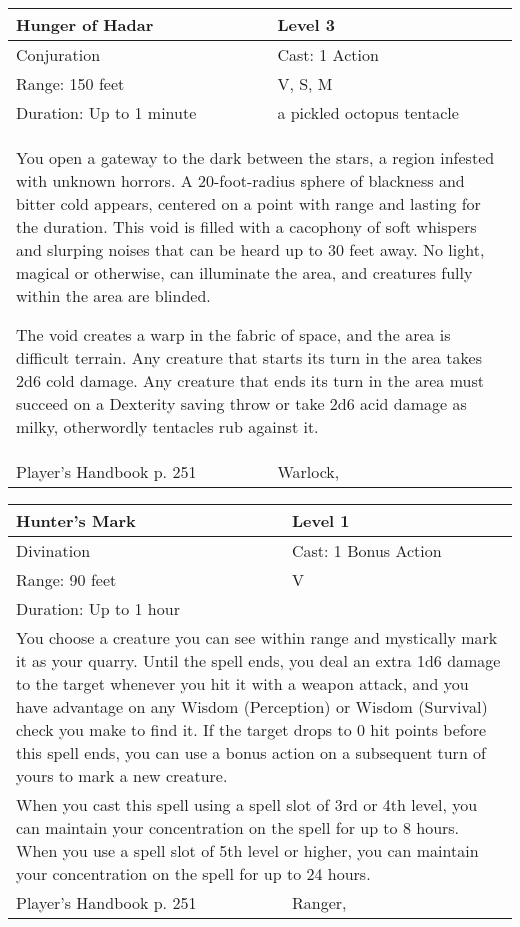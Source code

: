 \documentclass[11pt]{report}
\begin{document}
\begin{table}[H]
	\begin{tabular}{||p{6cm}|p{6cm}||}
		\hline\hline
		\bf{Hunger of Hadar} & Level 3\\ \hline
		Conjuration & Cast: 1 Action\\ \hline
		Range: 150 feet & V, S, M\\ \hline
		Duration: Up to 1 minute & a pickled octopus tentacle\\ \hline
		\multicolumn{2}{||p{12cm}||}{You open a gateway to the dark between the stars, a region infested with unknown horrors. A 20-foot-radius sphere of blackness and bitter cold appears, centered on a point with range and lasting for the duration. This void is filled with a cacophony of soft whispers and slurping noises that can be heard up to 30 feet away. No light, magical or otherwise, can illuminate the area, and creatures fully within the area are blinded.

The void creates a warp in the fabric of space, and the area is difficult terrain. Any creature that starts its turn in the area takes 2d6 cold damage. Any creature that ends its turn in the area must succeed on a Dexterity saving throw or take 2d6 acid damage as milky, otherwordly tentacles rub against it.}\\ \hline
Player's Handbook p. 251 & Warlock, \\ \hline\hline
	\end{tabular}
\end{table}

\begin{table}[H]
	\begin{tabular}{||p{6cm}|p{6cm}||}
		\hline\hline
		\bf{Hunter’s Mark} & Level 1\\ \hline
		Divination & Cast: 1 Bonus Action\\ \hline
		Range: 90 feet & V\\ \hline
		Duration: Up to 1 hour & \\ \hline
		\multicolumn{2}{||p{12cm}||}{You choose a creature you can see within range and mystically mark it as your quarry.
Until the spell ends, you deal an extra 1d6 damage to the target whenever you hit it with a weapon attack, and you have advantage on any Wisdom (Perception) or Wisdom (Survival) check you make to find it. If the target drops to 0 hit points before this spell ends, you can use a bonus action on a subsequent turn of yours to mark a new creature.}\\ \hline
		\multicolumn{2}{||p{12cm}||}{When you cast this spell using a spell slot of 3rd or 4th level, you can maintain your concentration on the spell for up to 8 hours.
When you use a spell slot of 5th level or higher, you can maintain your concentration on the spell for up to 24 hours.}\\ \hline
Player's Handbook p. 251 & Ranger, \\ \hline\hline
	\end{tabular}
\end{table}
\end{document}
